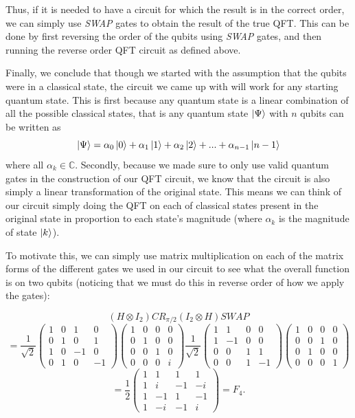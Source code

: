 \documentclass[11pt]{report}
\newcommand{\?}{\stackrel{?}{=}}
\begin{document}
Thus, if it is needed to have a circuit for which the result is in the correct order, we can simply use \textit{SWAP} gates to obtain the result of the true QFT. This can be done by first reversing the order of the qubits using \textit{SWAP} gates, and then running the reverse order QFT circuit as defined above.

Finally, we conclude that though we started with the assumption that the qubits were in a classical state, the circuit we came up with will work for any starting quantum state. This is first because any quantum state is a linear combination of all the possible classical states, that is any quantum state $\Ket{\Psi}$ with $n$ qubits can be written as
$$\Ket{\Psi} = \alpha_0\Ket{0} + \alpha_1\Ket{1} + \alpha_2\Ket{2} + ... + \alpha_{n-1}\Ket{n-1}$$
where all $\alpha_k \in \mathbb{C}$. Secondly, because we made sure to only use valid quantum gates in the construction of our QFT circuit, we know that the circuit is also simply a linear transformation of the original state. This means we can think of our circuit simply doing the QFT on each of classical states present in the original state in proportion to each state's magnitude (where $\alpha_k$ is the magnitude of state $\Ket{k}$).

To motivate this, we can simply use matrix multiplication on each of the matrix forms of the different gates we used in our circuit to see what the overall function is on two qubits (noticing that we must do this in reverse order of how we apply the gates):

$$(H \otimes I_2)CR_{\pi/2}(I_2 \otimes H)\textit{SWAP}$$
$$= \frac{1}{\sqrt{2}}\begin{pmatrix}
1 & 0 & 1 & 0 \\
0 & 1 & 0 & 1 \\
1 & 0 &-1 & 0 \\
0 & 1 & 0 &-1
\end{pmatrix}
\begin{pmatrix}
1 & 0 & 0 & 0 \\
0 & 1 & 0 & 0 \\
0 & 0 & 1 & 0 \\
0 & 0 & 0 & i
\end{pmatrix}
\frac{1}{\sqrt{2}}\begin{pmatrix}
1 & 1 & 0 & 0 \\
1 &-1 & 0 & 0 \\
0 & 0 & 1 & 1 \\
0 & 0 & 1 &-1
\end{pmatrix}
\begin{pmatrix}
1 & 0 & 0 & 0\\
0 & 0 & 1 & 0\\
0 & 1 & 0 & 0\\
0 & 0 & 0 & 1
\end{pmatrix}$$
$$=\frac{1}{2} \begin{pmatrix}
1 & 1 & 1 & 1 \\
1 & i & -1 & -i \\
1 & -1 & 1 & -1 \\
1 & -i & -1 & i
\end{pmatrix} = F_4.$$
\end{document}
